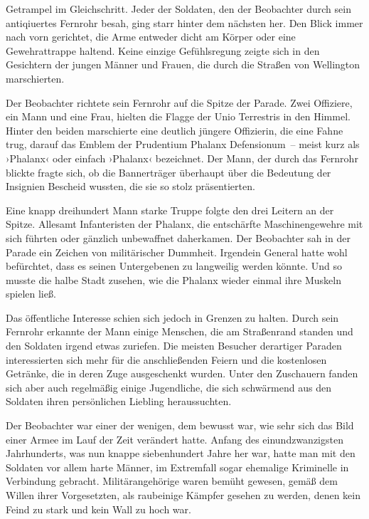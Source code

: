 Getrampel im Gleichschritt. Jeder der Soldaten, den der Beobachter durch sein antiqiuertes Fernrohr besah, ging starr hinter dem nächsten her. Den Blick immer nach vorn gerichtet, die Arme entweder dicht am Körper oder eine Gewehrattrappe haltend. Keine einzige Gefühlsregung zeigte sich in den Gesichtern der jungen Männer und Frauen, die durch die Straßen von Wellington marschierten.

\par

Der Beobachter richtete sein Fernrohr auf die Spitze der Parade. Zwei Offiziere, ein Mann und eine Frau, hielten die Flagge der Unio Terrestris in den Himmel. Hinter den beiden marschierte eine deutlich jüngere Offizierin, die eine Fahne trug, darauf das Emblem der Prudentium Phalanx Defensionum~-- meist kurz als ›Phalanx‹ oder einfach ›Phalanx‹ bezeichnet. Der Mann, der durch das Fernrohr blickte fragte sich, ob die Bannerträger überhaupt über die Bedeutung der Insignien Bescheid wussten, die sie so stolz präsentierten.

\par

Eine knapp dreihundert Mann starke Truppe folgte den drei Leitern an der Spitze. Allesamt Infanteristen der Phalanx, die entschärfte Maschinengewehre mit sich führten oder gänzlich unbewaffnet daherkamen. Der Beobachter sah in der Parade ein Zeichen von militärischer Dummheit. Irgendein General hatte wohl befürchtet, dass es seinen Untergebenen zu langweilig werden könnte. Und so musste die halbe Stadt zusehen, wie die Phalanx wieder einmal ihre Muskeln spielen ließ.

\par

Das öffentliche Interesse schien sich jedoch in Grenzen zu halten. Durch sein Fernrohr erkannte der Mann einige Menschen, die am Straßenrand standen und den Soldaten irgend etwas zuriefen. Die meisten Besucher derartiger Paraden interessierten sich mehr für die anschließenden Feiern und die kostenlosen Getränke, die in deren Zuge ausgeschenkt wurden. Unter den Zuschauern fanden sich aber auch regelmäßig einige Jugendliche, die sich schwärmend aus den Soldaten ihren persönlichen Liebling heraussuchten.

\par

Der Beobachter war einer der wenigen, dem bewusst war, wie sehr sich das Bild einer Armee im Lauf der Zeit verändert hatte. Anfang des einundzwanzigsten Jahrhunderts, was nun knappe siebenhundert Jahre her war, hatte man mit den Soldaten vor allem harte Männer, im Extremfall sogar ehemalige Kriminelle in Verbindung gebracht. Militärangehörige waren bemüht gewesen, gemäß dem Willen ihrer Vorgesetzten, als raubeinige Kämpfer gesehen zu werden, denen kein Feind zu stark und kein Wall zu hoch war.

